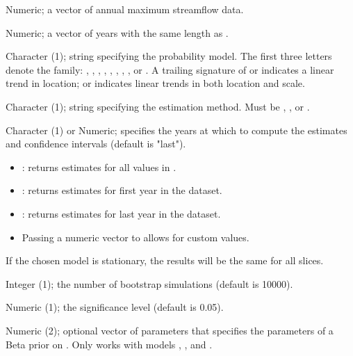 \documentclass[a4paper]{book}
\begin{document}
\begin{Arguments}
\begin{ldescription}
\item[\code{data}] Numeric; a vector of annual maximum streamflow data.

\item[\code{years}] Numeric; a vector of years with the same length as .

\item[\code{model}] Character (1); string specifying the probability model. The first three
letters denote the family: , , , , , , ,
, or . A trailing signature of  or  indicates a linear trend
in location;  or  indicates linear trends in both location and scale.

\item[\code{method}] Character (1); string specifying the estimation method.
Must be , , or .

\item[\code{slices}] Character (1) or Numeric; specifies the years at which
to compute the estimates and confidence intervals (default is "last").
\begin{itemize}

\item{} : returns estimates for all values in .
\item{} : returns estimates for first year in the dataset.
\item{} : returns estimates for last year in the dataset.
\item{} Passing a numeric vector to  allows for custom values.

\end{itemize}


If the chosen model is stationary, the results will be the same for all slices.

\item[\code{n\_sim}] Integer (1); the number of bootstrap simulations (default is 10000).

\item[\code{alpha}] Numeric (1); the significance level (default is 0.05).

\item[\code{prior}] Numeric (2); optional vector of parameters  that specifies
the parameters of a Beta prior on \eqn{\kappa}{}. Only works with models ,
, and .
\end{ldescription}
\end{Arguments}
\end{document}
